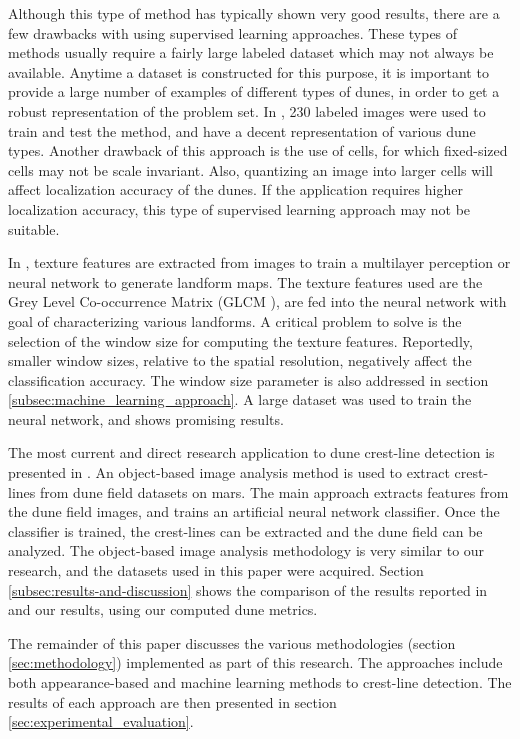 Although this type of method has typically shown very good results, there are a few drawbacks with using supervised learning approaches. These types of methods usually require a fairly large labeled dataset which may not always be available. Anytime a dataset is constructed for this purpose, it is important to provide a large number of examples of different types of dunes, in order to get a robust representation of the problem set. In \cite{BandeiraMarques}, 230 labeled images were used to train and test the method, and have a decent representation of various dune types. Another drawback of this approach is the use of cells, for which fixed-sized cells may not be scale invariant. Also, quantizing an image into larger cells	will affect localization accuracy of the dunes. If the application requires higher localization accuracy, this type of supervised learning approach may not be suitable.

In \cite{2011_neural_network_based_dunal_landform_mapping}, texture features are extracted from images to train a multilayer perception or neural network to generate landform maps. The texture features used are the Grey Level Co-occurrence Matrix (GLCM \cite{1973_textural_features_image_classification}), are fed into the neural network with goal of characterizing various landforms. A critical problem to solve is the selection of the window size for computing the texture features. Reportedly, smaller window sizes, relative to the spatial resolution, negatively affect the classification accuracy. The window size parameter is also addressed in section \ref{subsec:machine_learning_approach}. A large dataset was used to train the neural network, and shows promising results.

The most current and direct research application to dune crest-line detection is presented in \cite{vaz_object_based_dune_analysis}. An object-based image analysis method is used to extract crest-lines from dune field datasets on mars. The main approach extracts features from the dune field images, and trains an artificial neural network classifier. Once the classifier is trained, the crest-lines can be extracted and the dune field can be analyzed. The object-based image analysis methodology is very similar to our research, and the datasets used in this paper were acquired. Section \ref{subsec:results-and-discussion} shows the comparison of the results reported in \cite{vaz_object_based_dune_analysis} and our results, using our computed dune metrics.

The remainder of this paper discusses the various methodologies (section \ref{sec:methodology}) implemented as part of this research. The approaches include both appearance-based and machine learning methods to crest-line detection. The results of each approach are then presented in section \ref{sec:experimental_evaluation}.